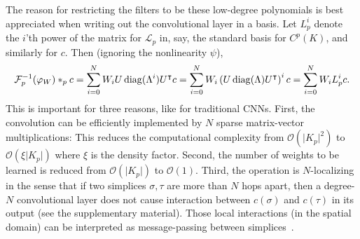 The reason for restricting the filters to be these low-degree polynomials is best appreciated when writing out the convolutional layer in a basis. Let $L^i_p$ denote the $i$'th power of the matrix for $\mathcal{L}_p$ in, say, the standard basis for $C^p(K)$, and similarly for $c$. Then (ignoring the nonlinearity $\psi$), 
\begin{equation*}
  \mathcal{F}\inv_p(\varphi_W)\ast_p c = \sum_{i=0}^N W_iU\diag(\Lambda^i)U\transpose c = \sum_{i=0}^N W_i\left(U\diag(\Lambda)U\transpose\right)^i c = \sum_{i=0}^NW_iL^i_pc. %
\end{equation*}
This is important for three reasons, like for traditional CNNs.
First, the convolution can be efficiently implemented by $N$ sparse matrix-vector multiplications: This reduces the computational complexity from $\mathcal{O}(\lvert K_p\rvert^2)$ to $\mathcal{O}(\xi\lvert K_p\rvert)$ where $\xi$ is the density factor.
Second, the number of weights to be learned is reduced from $\mathcal{O}(\lvert K_p\rvert)$ to $\mathcal{O}(1)$.
Third, the operation is $N$-localizing in the sense that if two simplices $\sigma,\tau$ are more than $N$ hops apart, then a degree-$N$ convolutional layer does not cause interaction between $c(\sigma)$ and $c(\tau)$ in its output (see the supplementary material).
Those local interactions (in the spatial domain) can be interpreted as message-passing between simplices~\cite{gilmer2017NeuralMP}.

